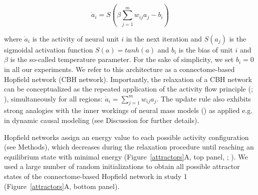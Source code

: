 \documentclass{article}
\begin{document}
\begin{equation}
\label{hopfield-update}
\dot{a}_i = S(\beta \sum_{j=1}^m w_{ij}a_j - b_i)
\end{equation}

where $\dot{a}_i$ is the activity of neural unit $i$ in the next iteration and $S(a_j)$ is the sigmoidal activation function $S(a) = tanh(a)$ and $b_i$ is the bias of unit $i$ and $\beta$ is the so-called temperature parameter. For the sake of simplicity, we set $b_i=0$ in all our experiments. We refer to this architecture as a connectome-based Hopfield network (CBH network).
Importantly, the relaxation of a CBH network can be conceptualized as the repeated application of the activity flow principle (\href{https://doi.org/10.1038/nn.4406}{}; \href{https://doi.org/10.1038/s41467-017-01000-w}{}), simultaneously for all regions: $\dot{a}_i = \sum_{j=1}^m w_{ij}a_j$.
The update rule also exhibits strong analogies with the inner workings of neural mass models  (\href{https://doi.org/10.1038/nn.4497}{}) as applied e.g. in dynamic causal modeling (see Discussion for further details).

Hopfield networks assign an energy value to each possible activity configuration (see Methods), which decreases during the relaxation procedure until reaching an equilibrium state with minimal energy (Figure~\ref{attractors}A, top panel, \href{https://doi.org/10.1073/pnas.79.8.2554}{}; \href{https://doi.org/10.1162/neco.1994.6.3.459}{}).
We used a large number of random initializations to obtain all possible attractor states of the connectome-based Hopfield network in study 1 (Figure~\ref{attractors}A, bottom panel).
\end{document}

